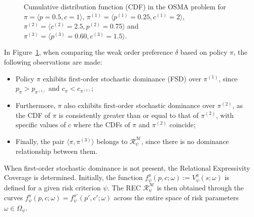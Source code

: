 \documentclass[runningheads]{llncs}
\begin{document}
\begin{figure}[ht]
    \caption{Cumulative distribution function (CDF) in the OSMA problem for $\pi = \langle p=0.5, c=1 \rangle$, $\pi^{(1)} = \langle p^{(1)} = 0.25, c^{(1)} = 2 \rangle$, $\pi^{(2)} = \langle c^{(2)} = 2.5, p^{(2)} = 0.75 \rangle$ and $\pi^{(3)} = \langle p^{(3)} = 0.60, c^{(3)} = 1.5 \rangle$.}
    \label{fig:osma-cdf}
\end{figure}

In Figure~\ref{fig:osma-cdf}, when comparing the weak order preference $\delta$ based on policy $\pi$, the following observations are made:
\begin{itemize}
    \item Policy $\pi$ exhibits first-order stochastic dominance (FSD) over $\pi^{(1)}$, since $p_{\pi} > p_{\pi^{(1)}}$ and $c_{\pi} < c_{\pi^{(1)}}$;
    \item Furthermore, $\pi$ also exhibits first-order stochastic dominance over $\pi^{(2)}$, as the CDF of $\pi$ is consistently greater than or equal to that of $\pi^{(2)}$, with specific values of $c$ where the CDFs of $\pi$ and $\pi^{(2)}$ coincide;
    \item Finally, the pair $\langle \pi, \pi^{(3)} \rangle$ belongs to $\mathcal{R}^{\mathcal{M}}_{\psi}$, since there is no dominance relationship between them.
\end{itemize}

When first-order stochastic dominance is not present, the Relational Expressivity Coverage is determined. Initially, the function $ f^{\pi}_{\psi}(p,c;\omega) := V^{\pi}_{\psi}(s; \omega) $ is defined for a given risk criterion $\psi$. The REC $\mathcal{R}^{\mathcal{M}}_{\psi}$ is then obtained through the curves $ f^{\pi}_{\psi}(p,c;\omega) = f^{\pi'}_{\psi}(p',c';\omega) $ across the entire space of risk parameters $\omega \in \Omega_{\psi}$.
\end{document}

